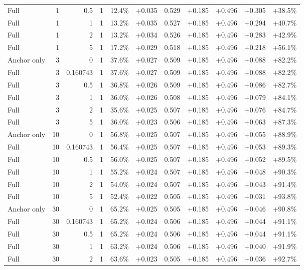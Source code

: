 \begin{table}[htbp]
\begin{tabular}{lrrrccccccc}
Full & 1 & 0.5 & 1 & 12.4\% & +0.035 & 0.529 & +0.185 & +0.496 & +0.305 & +38.5\% \\
Full & 1 & 1 & 1 & 13.2\% & +0.035 & 0.527 & +0.185 & +0.496 & +0.294 & +40.7\% \\
Full & 1 & 2 & 1 & 13.2\% & +0.034 & 0.526 & +0.185 & +0.496 & +0.283 & +42.9\% \\
Full & 1 & 5 & 1 & 17.2\% & +0.029 & 0.518 & +0.185 & +0.496 & +0.218 & +56.1\% \\
Anchor only & 3 & 0 & 1 & 37.6\% & +0.027 & 0.509 & +0.185 & +0.496 & +0.088 & +82.2\% \\
Full & 3 & 0.160743 & 1 & 37.6\% & +0.027 & 0.509 & +0.185 & +0.496 & +0.088 & +82.2\% \\
Full & 3 & 0.5 & 1 & 36.8\% & +0.026 & 0.509 & +0.185 & +0.496 & +0.086 & +82.7\% \\
Full & 3 & 1 & 1 & 36.0\% & +0.026 & 0.508 & +0.185 & +0.496 & +0.079 & +84.1\% \\
Full & 3 & 2 & 1 & 35.6\% & +0.025 & 0.507 & +0.185 & +0.496 & +0.076 & +84.7\% \\
Full & 3 & 5 & 1 & 36.0\% & +0.023 & 0.506 & +0.185 & +0.496 & +0.063 & +87.3\% \\
Anchor only & 10 & 0 & 1 & 56.8\% & +0.025 & 0.507 & +0.185 & +0.496 & +0.055 & +88.9\% \\
Full & 10 & 0.160743 & 1 & 56.4\% & +0.025 & 0.507 & +0.185 & +0.496 & +0.053 & +89.3\% \\
Full & 10 & 0.5 & 1 & 56.0\% & +0.025 & 0.507 & +0.185 & +0.496 & +0.052 & +89.5\% \\
Full & 10 & 1 & 1 & 55.2\% & +0.024 & 0.507 & +0.185 & +0.496 & +0.048 & +90.3\% \\
Full & 10 & 2 & 1 & 54.0\% & +0.024 & 0.507 & +0.185 & +0.496 & +0.043 & +91.4\% \\
Full & 10 & 5 & 1 & 52.4\% & +0.022 & 0.505 & +0.185 & +0.496 & +0.031 & +93.8\% \\
Anchor only & 30 & 0 & 1 & 65.2\% & +0.025 & 0.505 & +0.185 & +0.496 & +0.046 & +90.8\% \\
Full & 30 & 0.160743 & 1 & 65.2\% & +0.024 & 0.506 & +0.185 & +0.496 & +0.044 & +91.1\% \\
Full & 30 & 0.5 & 1 & 65.2\% & +0.024 & 0.506 & +0.185 & +0.496 & +0.044 & +91.1\% \\
Full & 30 & 1 & 1 & 63.2\% & +0.024 & 0.506 & +0.185 & +0.496 & +0.040 & +91.9\% \\
Full & 30 & 2 & 1 & 63.6\% & +0.023 & 0.505 & +0.185 & +0.496 & +0.036 & +92.7\% \\

\end{tabular}
\end{table}
